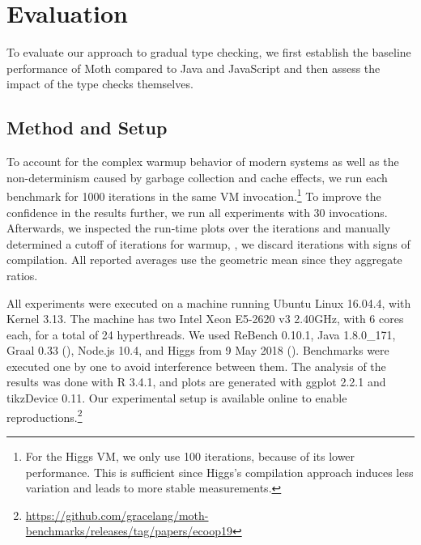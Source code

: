 
\section{Evaluation}
\label{sec:evaluation}

\newcommand{\NumIterationsAll}{1000\xspace}
\newcommand{\NumIterationsHiggs}{100\xspace}


To evaluate our approach to gradual type checking,
we first establish the baseline performance of Moth
compared to Java and JavaScript
and then assess the impact of the type checks themselves.

\subsection{Method and Setup}

To account for the complex warmup behavior
of modern systems\citep{Barrett:2017:VMW} as well as
the non-determinism caused by \eg garbage collection and cache effects,
we run each benchmark for \NumIterationsAll iterations in the same
VM invocation.\footnote{
For the Higgs VM, we only use \NumIterationsHiggs iterations,
because of its lower performance.
This is sufficient since Higgs's compilation approach induces less variation
and leads to more stable measurements.}
To improve the confidence in the results further,
we run all experiments with 30 invocations.
Afterwards, we inspected the run-time plots over the iterations
and manually determined a cutoff of \WarmupCutOff iterations for warmup,
\ie, we discard iterations with signs of compilation.
All reported averages use the geometric mean since they aggregate ratios.

%
All experiments were executed on a machine running Ubuntu Linux 16.04.4,
with Kernel 3.13.
The machine has two Intel Xeon E5-2620 v3 2.40GHz,
with 6 cores each, for a total of 24 hyperthreads.
We used ReBench 0.10.1\citep{ReBench:2018}, Java 1.8.0\_171, Graal 0.33 (),
Node.js 10.4, and Higgs from 9 May 2018 ().
Benchmarks were executed one by one to avoid interference between them.
The analysis of the results was done with R 3.4.1,
and plots are generated with ggplot 2.2.1 and tikzDevice 0.11.
Our experimental setup is available online to enable reproductions.\footnote{\url{https://github.com/gracelang/moth-benchmarks/releases/tag/papers/ecoop19}}



